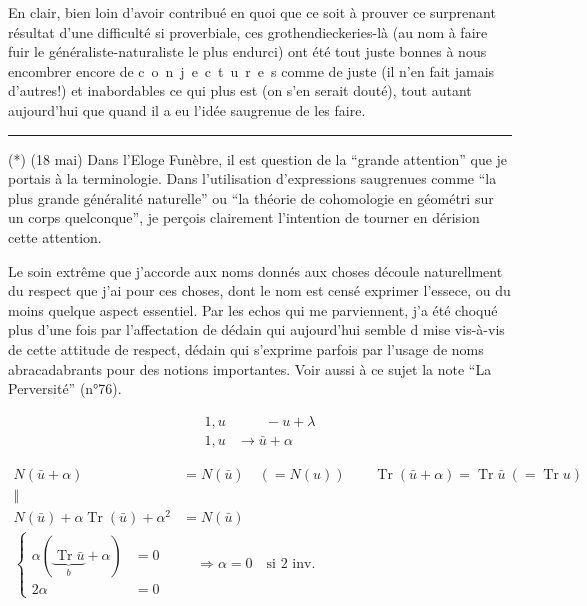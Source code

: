 En clair, bien loin d'avoir contribué en quoi que ce soit à prouver ce surprenant résultat d'une difficulté si proverbiale, ces grothendieckeries-là (au nom à faire fuir le généraliste-naturaliste le plus endurci) ont été tout juste bonnes à nous encombrer encore de \mbox{c o n j e c t u r e s} comme de juste (il n'en fait jamais d'autres!) et inabordables ce qui plus est (on s'en serait douté), tout autant aujourd'hui que quand il a eu l'idée saugrenue de les faire.

\noindent\rule{.22\linewidth}{.4pt}

(*) (18 mai) Dans l'Eloge Funèbre, il est question de la ``grande attention'' que je portais à la terminologie. Dans l'utilisation d'expressions saugrenues comme ``la plus grande généralité naturelle'' ou ``la théorie de cohomologie en géométri sur un corps quelconque'', je perçois clairement l'intention de tourner en dérision cette attention.

Le soin extrême que j'accorde aux noms donnés aux choses découle naturellment du respect que j'ai pour ces choses, dont le nom est censé exprimer l'essece, ou du moins quelque aspect essentiel. Par les echos qui me parviennent, j'a été choqué plus d'une fois par l'affectation de dédain qui aujourd'hui semble d mise vis-à-vis de cette attitude de respect, dédain qui s'exprime parfois par l'usage de noms abracadabrants pour des notions importantes. Voir aussi à ce sujet la note ``La Perversité'' (n°76).

\[
\begin{aligned}
1,u&\qquad -u+\lambda\\
1,u&\longrightarrow \bar u+\alpha
\end{aligned}
\]

\[
\begin{aligned}
N(\bar u+\alpha)&=N(\bar u)\quad(=N(u))\qquad
\operatorname{Tr}(\bar u+\alpha)=\operatorname{Tr}\bar u\ (= \operatorname{Tr}u)\\
\Vert&\\
N(\bar u)+\alpha\operatorname{Tr}(\bar u)+\alpha^2&=N(\bar u)\\
\left\{\begin{aligned}\alpha(\underbrace{\operatorname{Tr}\bar u}_{b}+\alpha)&=0\\2\alpha&=0\end{aligned}\right.&\quad\Longrightarrow\alpha=0\quad\text{si $2$ inv.}
\end{aligned}
\]

